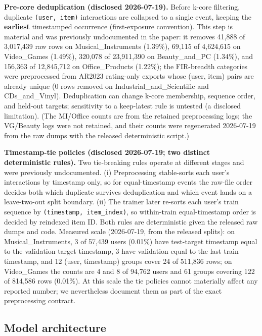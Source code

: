 \textbf{Pre-core deduplication (disclosed 2026-07-19).} Before k-core filtering, duplicate \texttt{(user, item)} interactions are collapsed to a single event, keeping the \textbf{earliest} timestamped occurrence (first-exposure convention). This step is material and was previously undocumented in the paper: it removes 41,888 of 3,017,439 raw rows on Musical\_Instruments (1.39\%), 69,115 of 4,624,615 on Video\_Games (1.49\%), 320,078 of 23,911,390 on Beauty\_and\_PC (1.34\%), and 156,363 of 12,845,712 on Office\_Products (1.22\%); the FIR-breadth categories were preprocessed from AR2023 rating-only exports whose (user, item) pairs are already unique (0 rows removed on Industrial\_and\_Scientific and CDs\_and\_Vinyl). Deduplication can change k-core membership, sequence order, and held-out targets; sensitivity to a keep-latest rule is untested (a disclosed limitation). (The MI/Office counts are from the retained preprocessing logs; the VG/Beauty logs were not retained, and their counts were regenerated 2026-07-19 from the raw dumps with the released deterministic script.)


\textbf{Timestamp-tie policies (disclosed 2026-07-19; two distinct deterministic rules).} Two tie-breaking rules operate at different stages and were previously undocumented. (i) Preprocessing stable-sorts each user's interactions by timestamp only, so for equal-timestamp events the raw-file order decides both which duplicate survives deduplication and which event lands on a leave-two-out split boundary. (ii) The trainer later re-sorts each user's train sequence by \texttt{(timestamp, item\_index)}, so within-train equal-timestamp order is decided by reindexed item ID. Both rules are deterministic given the released raw dumps and code. Measured scale (2026-07-19, from the released splits): on Musical\_Instruments, 3 of 57,439 users (0.01\%) have test-target timestamp equal to the validation-target timestamp, 3 have validation equal to the last train timestamp, and 12 (user, timestamp) groups cover 24 of 511,836 rows; on Video\_Games the counts are 4 and 8 of 94,762 users and 61 groups covering 122 of 814,586 rows (0.01\%). At this scale the tie policies cannot materially affect any reported number; we nevertheless document them as part of the exact preprocessing contract.


\subsection{Model architecture}\label{sec:3.2}

